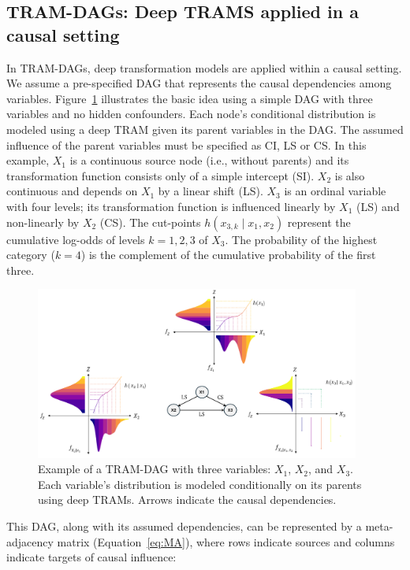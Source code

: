 \subsection{TRAM-DAGs: Deep TRAMS applied in a causal setting} \label{sec:tram_dags}



In TRAM-DAGs, deep transformation models are applied within a causal setting. We assume a pre-specified DAG that represents the causal dependencies among variables. 
Figure~\ref{fig:tram_dag} illustrates the basic idea using a simple DAG with three variables and no hidden confounders. Each node's conditional distribution is modeled using a deep TRAM given its parent variables in the DAG. The assumed influence of the parent variables must be specified as CI, LS or CS. In this example, $X_1$ is a continuous source node (i.e., without parents) and its transformation function consists only of a simple intercept (SI). $X_2$ is also continuous and depends on $X_1$ by a linear shift (LS). $X_3$ is an ordinal variable with four levels; its transformation function is influenced linearly by $X_1$ (LS) and non-linearly by $X_2$ (CS). The cut-points $h(x_{3,k} \mid x_1, x_2)$ represent the cumulative log-odds of levels $k = 1, 2, 3$ of $X_3$. The probability of the highest category ($k = 4$) is the complement of the cumulative probability of the first three.


\begin{figure}[H]
\centering
\includegraphics[width=0.95\textwidth]{img/tram_dag.png}
\caption{Example of a TRAM-DAG with three variables: $X_1$, $X_2$, and $X_3$. Each variable's distribution is modeled conditionally on its parents using deep TRAMs. Arrows indicate the causal dependencies.}
\label{fig:tram_dag}
\end{figure}

This DAG, along with its assumed dependencies, can be represented by a meta-adjacency matrix (Equation~\ref{eq:MA}), where rows indicate sources and columns indicate targets of causal influence:


